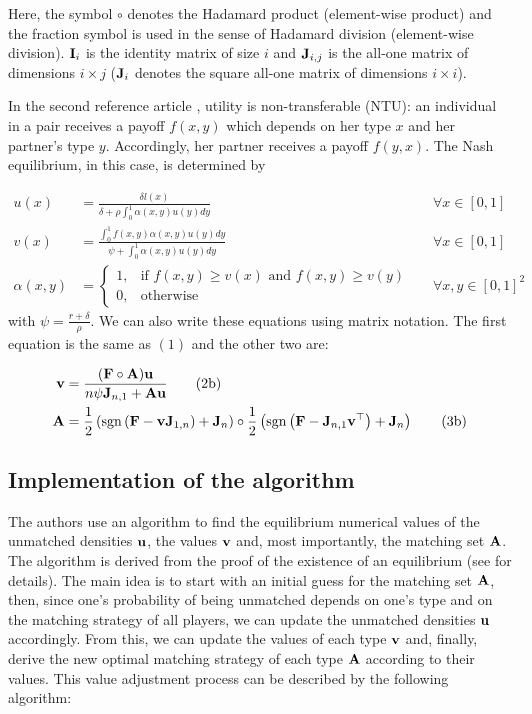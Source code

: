Here, the symbol $\circ$ denotes the Hadamard product (element-wise product) and the fraction symbol is used in the sense of Hadamard division (element-wise division).
$\boldsymbol{\mathbf{I}}_i$ is the identity matrix of size $i$ and $\boldsymbol{\mathbf{J}}_{i,j}$ is the all-one matrix of dimensions $i \times j$ ($\boldsymbol{\mathbf{J}}_{i}$ denotes the square all-one matrix of dimensions $i \times i$).


In the second reference article \citep{smith_marriage_2006}, utility is non-transferable (NTU): an individual in a pair receives a payoff $f(x,y)$ which depends on her type $x$ and her partner's type $y$. Accordingly, her partner receives a payoff $f(y,x)$. The Nash equilibrium, in this case, is determined by

\begin{align*}[left=\empheqlbrace]
	u(x) &= \frac{\delta l(x)}{\delta + \rho \int_{0}^{1} \alpha(x,y) u(y) dy} &&\forall x \in [0,1]\\
	v(x) &= \frac{\int_{0}^{1} f(x,y) \alpha(x,y) u(y) dy}{\psi + \int_{0}^{1} \alpha(x,y) u(y) dy} &&\forall x \in [0,1]\\
	\alpha(x,y) &=
	\begin{cases}
		1, & \text{if } f(x,y) \geq v(x) \text{ and } f(x,y) \geq v(y)\\
		0, & \text{otherwise}
	\end{cases}
	&&\forall x,y \in [0,1]^2 
\end{align*}
with $\psi = \frac{r+\delta}{\rho}$. We can also write these equations using matrix notation. The first equation is the same as $(1)$ and the other two are:

\begin{align}[left=\empheqlbrace]
	\vect{v} &= \frac{(\vect{F} \circ \vect{A})\vect{u}}{n \psi \vect{J}_{n,1} + \vect{A} \vect{u}}
	\tag{2b}\\
	\vect{A} &= \frac{1}{2} \left(\sgn{\left( \vect{F} - \vect{v} \vect{J}_{1,n} \right)} + \vect{J}_n \right) \circ \frac{1}{2} \left(\sgn{\left( \vect{F} - \vect{J}_{n,1} \vect{v}^\top \right)} + \vect{J}_n \right)
	\tag{3b}
\end{align}





\subsection*{Implementation of the algorithm}

The authors use an algorithm to find the equilibrium numerical values of the unmatched densities $\boldsymbol{\mathbf{u}}$, the values $\boldsymbol{\mathbf{v}}$ and, most importantly, the matching set $\boldsymbol{\mathbf{A}}$. The algorithm is derived from the proof of the existence of an equilibrium (see \citep{smith_frictional_2011} for details). The main idea is to start with an initial guess for the matching set $\boldsymbol{\mathbf{A}}$, then, since one's probability of being unmatched depends on one's type and on the matching strategy of all players, we can update the unmatched densities $\boldsymbol{\mathbf{u}}$ accordingly. From this, we can update the values of each type $\boldsymbol{\mathbf{v}}$ and, finally, derive the new optimal matching strategy of each type $\boldsymbol{\mathbf{A}}$ according to their values. This value adjustment process can be described by the following algorithm:


